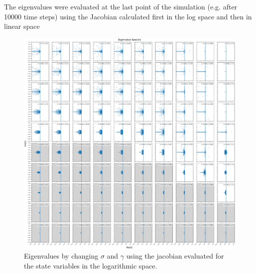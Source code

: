 \documentclass[11pt,a4paper,fleqn]{scrartcl}
\begin{document}
\clearpage

The eigenvalues were evaluated at the last point of the simulation (e.g. after 10000 time steps) using the Jacobian calculated first in the log space and then in linear space
\begin{figure}[H]
    \centering
    \includegraphics[width=\linewidth]{SigmaGamma/EigenValuesLogSigmaGamma.pdf}
    \caption{Eigenvalues by changing $\sigma$ and $\gamma$ using the jacobian evaluated for the state variables in the logarithmic space.}
\end{figure}
\end{document}
